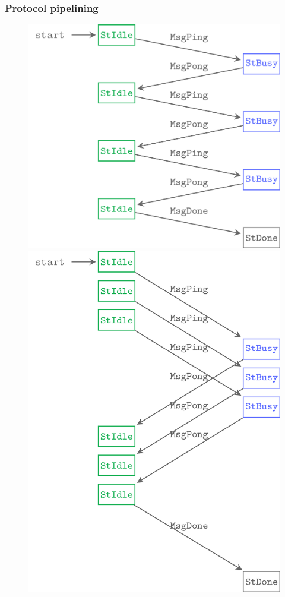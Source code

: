 \documentclass[t,dvipsnames]{beamer}
\begin{document}
\begin{frame}
  \frametitle{Protocol pipelining}

  \vspace{1cm}
  \begin{figure}
    \begin{minipage}{.4\textwidth}
      \includegraphics{../images/ping-pong-1.png}
      \vspace{2cm}
    \end{minipage}
    \begin{minipage}{.4\textwidth}
      \includegraphics{../images/ping-pong-2.png}

\end{minipage}
\end{figure}
\end{frame}
\end{document}
